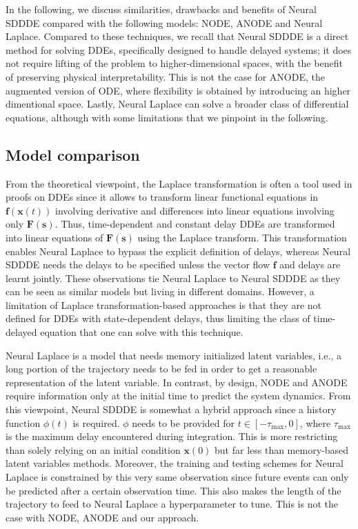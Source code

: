  In the following, we discuss similarities, drawbacks and benefits of Neural SDDDE compared with the following models: NODE, ANODE and Neural Laplace. Compared to these techniques, we recall that Neural SDDDE is a direct method for solving DDEs, specifically designed to handle delayed systems; it does not require lifting of the problem to higher-dimensional spaces, with the benefit of preserving physical interpretability. This is not the case for ANODE, the augmented version of ODE, where flexibility is obtained by introducing an higher dimentional space. Lastly, Neural Laplace can solve a broader class of differential equations, although with some limitations that we pinpoint in the following.

\subsection{Model comparison} From the theoretical viewpoint, the Laplace transformation is often a tool used in proofs on DDEs \citep{Cook_book_ref_dde} since it allows to transform linear functional equations in $\mathbf{f}(\mathbf{x}(t))$ involving derivative and differences into linear equations involving only $\mathbf{F}(\mathbf{s})$. Thus, time-dependent and constant delay DDEs are transformed into linear equations of $\mathbf{F}(\mathbf{s})$ using the Laplace transform. This transformation enables Neural Laplace to bypass the explicit definition of delays, whereas Neural SDDDE needs the delays to be specified unless the vector flow $\mathbf{f}$ and delays are learnt jointly. These observations tie Neural Laplace to Neural SDDDE as they can be seen as similar models but living in different domains. However, a limitation of Laplace transformation-based approaches is that they are not defined for DDEs with state-dependent delays, thus limiting the class of time-delayed equation that one can solve with this technique. 

Neural Laplace is a model that needs memory initialized latent variables, i.e., a long portion of the trajectory needs to be fed in order to get a reasonable representation of the latent variable. In contrast, by design, NODE and ANODE require information only at the initial time to predict the system dynamics. From this viewpoint, Neural SDDDE is somewhat a hybrid approach since a history function $\phi(t)$ is required. $\phi$ needs to be provided for $t\in[-\tau_{\mathrm{max}},0]$, where $\tau_{\mathrm{max}}$ is the maximum delay encountered during integration. This is more restricting than solely relying on an initial condition $\mathbf{x}(0)$ but far less than memory-based latent variables methods. Moreover, the training and testing schemes for Neural Laplace is constrained by this very same observation since future events can only be predicted after a certain observation time. This also makes the length of the trajectory to feed to Neural Laplace a hyperparameter to tune. This is not the case with NODE, ANODE and our approach. 

